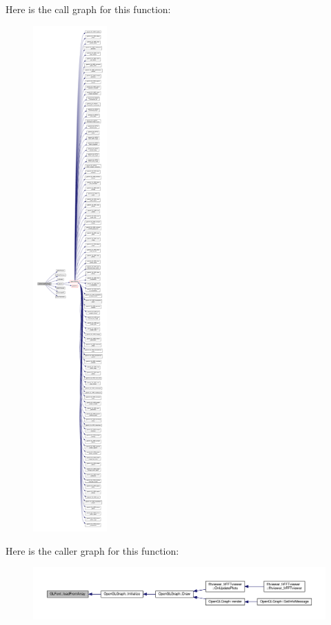 Here is the call graph for this function\+:
\nopagebreak
\begin{figure}[H]
\begin{center}
\leavevmode
\includegraphics[height=550pt]{d8/d9b/classGLFont_a94999edbe6ed99c8e8af8acd2f09ce90_cgraph}
\end{center}
\end{figure}




Here is the caller graph for this function\+:
\nopagebreak
\begin{figure}[H]
\begin{center}
\leavevmode
\includegraphics[width=350pt]{d8/d9b/classGLFont_a94999edbe6ed99c8e8af8acd2f09ce90_icgraph}
\end{center}
\end{figure}



